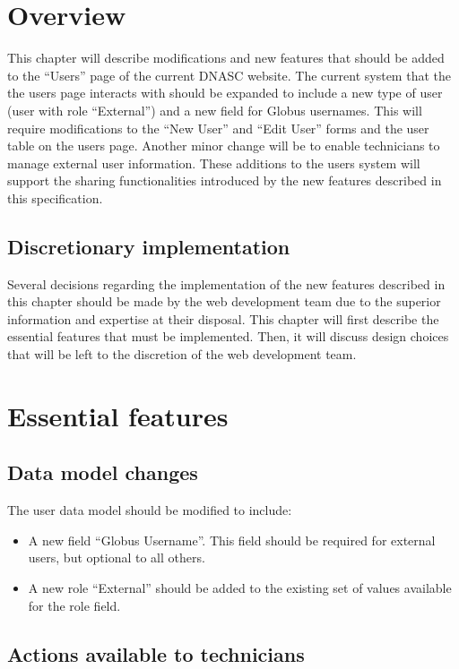 \section{Overview}

This chapter will describe modifications and new features that should be added to the
``Users'' page of the current DNASC website. The current system that the the users 
page interacts with should be expanded to include a new type of user (user with role 
``External'') and a new field for Globus usernames. This will require modifications 
to the ``New User'' and ``Edit User'' forms and the user table on the users page. Another 
minor change will be to enable technicians to manage external user information.
These additions to the users system will support the sharing functionalities introduced 
by the new features described in this specification. 

\subsection{Discretionary implementation}

Several decisions regarding the implementation of the new features described in this 
chapter should be made by the web development team due to the superior information and 
expertise at their disposal. This chapter will first describe the essential features 
that must be implemented. Then, it will discuss design choices that will be left to the 
discretion of the web development team.

\section{Essential features}

\subsection{Data model changes}

The user data model should be modified to include:
\begin{itemize}\itemsep1pt
    \item A new field ``Globus Username''. This field should be required for 
external users, but optional to all others.
    \item A new role ``External'' should be added to the existing set of values
    available for the role field.
\end{itemize}

\subsection{Actions available to technicians}

